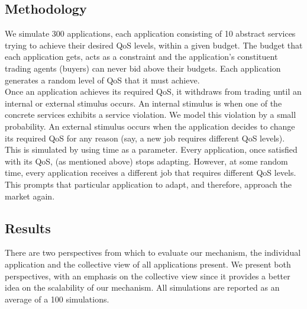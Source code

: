 \documentclass[10pt,journal,compsoc]{IEEEtran}
\begin{document}
\subsection{Methodology}
We simulate 300 applications, each application consisting of 10 abstract services trying to achieve their desired QoS levels, within a given budget. The budget that each application gets, acts as a constraint and the application's constituent trading agents (buyers) can never bid above their budgets. Each application generates a random level of QoS that it must achieve.\\
Once an application achieves its required QoS, it withdraws from trading until an internal or external stimulus occurs. An internal stimulus is when one of the concrete services exhibits a service violation. We model this violation by a small probability. An external stimulus occurs when the application decides to change its required QoS for any reason (say, a new job requires different QoS levels). This is simulated by using time as a parameter. Every application, once satisfied with its QoS, (as mentioned above) stops adapting. However, at some random time, every application receives a different job that requires different QoS levels. This prompts that particular application to adapt, and therefore, approach the market again.


\subsection{Results}
There are two perspectives from which to evaluate our mechanism, the individual application and the collective view of all applications present. We present both perspectives, with an emphasis on the collective view since it provides a better idea on the scalability of our mechanism. All simulations are reported as an average of a 100 simulations.\\
\end{document}
